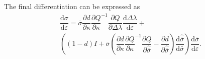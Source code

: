 \documentclass[5p]{elsarticle}
\newcommand*{\md}[1]{\mathrm{d}#1}
\newcommand*{\pdfrac}[2]{\dfrac{\partial#1}{\partial#2}}
\newcommand*{\ddfrac}[2]{\dfrac{\md#1}{\md#2}}
\begin{document}
The final differentiation can be expressed as
\begin{multline}
\ddfrac{\sigma}{\varepsilon}=\bar{\sigma}\pdfrac{d}{\kappa}\pdfrac{Q}{\kappa}^{-1}\pdfrac{Q}{\Delta\lambda}\ddfrac{\Delta\lambda}{\varepsilon}+\\\left(\left(1-d\right)I+\bar{\sigma}\left(\pdfrac{d}{\kappa}\pdfrac{Q}{\kappa}^{-1}\pdfrac{Q}{\hat{\bar{\sigma}}}-\pdfrac{d}{\hat{\bar{\sigma}}}\right)\ddfrac{\hat{\bar{\sigma}}}{\bar{\sigma}}\right)\ddfrac{\bar{\sigma}}{\varepsilon}.
\end{multline}
\end{document}
